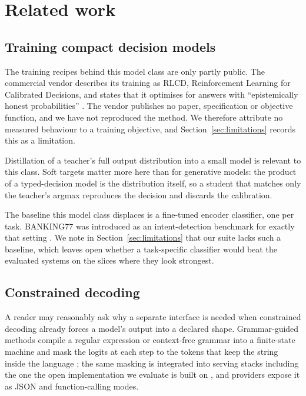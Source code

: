 \section{Related work}
\label{sec:related}

\subsection{Training compact decision models}

The training recipes behind this model class are only partly public. The
commercial vendor describes its training as RLCD, Reinforcement Learning for
Calibrated Decisions, and states that it optimises for answers with
``epistemically honest probabilities'' \citep{typesafe2026jev}. The vendor
publishes no paper, specification or objective function, and we have not
reproduced the method. We therefore attribute no measured behaviour to a
training objective, and Section~\ref{sec:limitations} records this as a
limitation.

Distillation of a teacher's full output distribution into a small model is
relevant to this class. Soft targets matter more here than for generative models: the product
of a typed-decision model is the distribution itself, so a student that matches
only the teacher's argmax reproduces the decision and discards the calibration.

The baseline this model class displaces is a fine-tuned encoder classifier, one
per task. BANKING77 was introduced as an intent-detection benchmark for exactly
that setting \citep{casanueva2020banking77}. We note in
Section~\ref{sec:limitations} that our suite lacks such a baseline, which leaves
open whether a task-specific classifier would beat the evaluated systems on the
slices where they look strongest.

\subsection{Constrained decoding}

A reader may reasonably ask why a separate interface is needed when constrained
decoding already forces a model's output into a declared shape. Grammar-guided
methods compile a regular expression or context-free grammar into a finite-state
machine and mask the logits at each step to the tokens that keep the string inside
the language \citep{willard2023outlines}; the same masking is integrated into
serving stacks including the one the open implementation we evaluate is built on
\citep{kwon2023vllm}, and providers expose it as JSON and function-calling modes.

